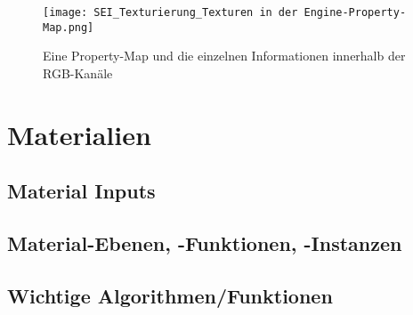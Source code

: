 \begin{figure}[h]
    \centering
    \texttt{[image: SEI\_Texturierung\_Texturen in der Engine-Property-Map.png]}
    \caption{Eine Property-Map und die einzelnen Informationen innerhalb der RGB-Kanäle}
    \label{picture:property_map}
\end{figure}


\section{Materialien}
\label{sec:materials}

\subsection{Material Inputs}
\label{sec:mat_inputs}

\subsection{Material-Ebenen, -Funktionen, -Instanzen}
\label{sec:mat_lay_func_ins}

\subsection{Wichtige Algorithmen/Funktionen}
\label{sec:algorithms}

